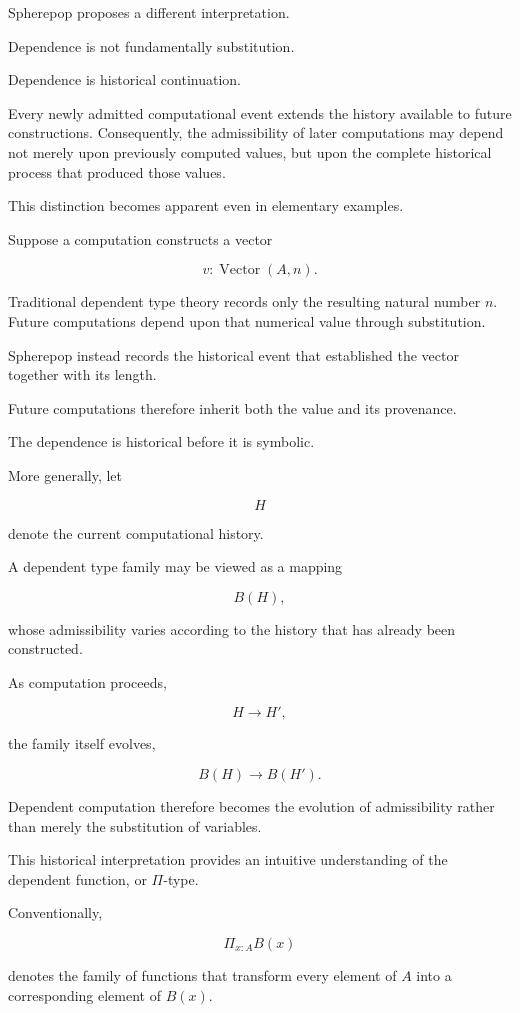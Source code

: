\documentclass[12pt,oneside]{article}
\theoremstyle{definition}
\theoremstyle{remark}
\begin{document}
Spherepop proposes a different interpretation.

Dependence is not fundamentally substitution.

Dependence is historical continuation.

Every newly admitted computational event extends the history available to
future constructions. Consequently, the admissibility of later computations may
depend not merely upon previously computed values, but upon the complete
historical process that produced those values.

This distinction becomes apparent even in elementary examples.

Suppose a computation constructs a vector

\[
v : \operatorname{Vector}(A,n).
\]

Traditional dependent type theory records only the resulting natural number
\(n\). Future computations depend upon that numerical value through
substitution.

Spherepop instead records the historical event that established the vector
together with its length.

Future computations therefore inherit both the value and its provenance.

The dependence is historical before it is symbolic.

More generally, let

\[
H
\]

denote the current computational history.

A dependent type family may be viewed as a mapping

\[
B(H),
\]

whose admissibility varies according to the history that has already been
constructed.

As computation proceeds,

\[
H
\longrightarrow
H',
\]

the family itself evolves,

\[
B(H)
\longrightarrow
B(H').
\]

Dependent computation therefore becomes the evolution of admissibility rather
than merely the substitution of variables.

This historical interpretation provides an intuitive understanding of the
dependent function, or \(\Pi\)-type.

Conventionally,

\[
\Pi_{x:A} B(x)
\]

denotes the family of functions that transform every element of \(A\) into a
corresponding element of \(B(x)\).
\end{document}
